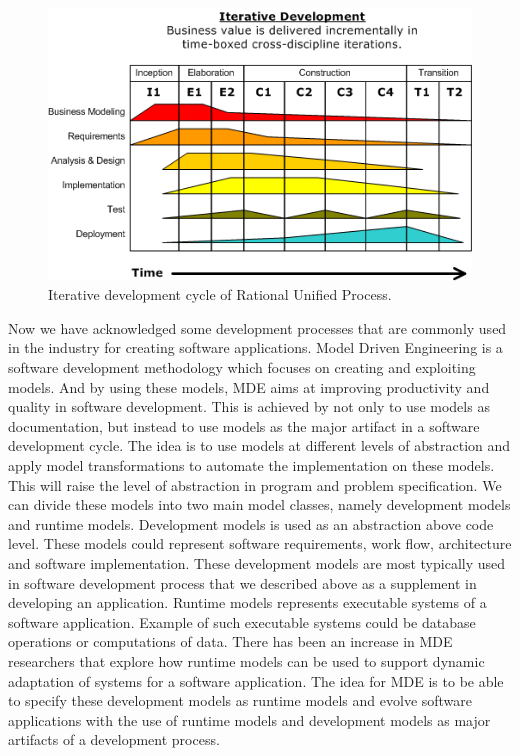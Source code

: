 \begin{figure}[H]
	\centering
	\includegraphics[scale=0.7]{./Figures/RUP.png}
	\caption[Rational Unified Process]
	{Iterative development cycle of Rational Unified Process.}
	\label{fig:RUP}
\end{figure}

Now we have acknowledged some development processes that are commonly used in
the industry for creating software applications. Model Driven Engineering is a
software development methodology which focuses on creating and exploiting
models. And by using these models,  MDE aims at improving productivity and
quality in software development. This is achieved by not only to use models as
documentation, but instead to use models as the major artifact in a software
development cycle. The idea is to use models at different levels of abstraction
and apply model transformations to automate the implementation on these
models. This will raise the level of abstraction in program and problem
specification. We can divide these models into two main model classes, namely
development models and runtime models. Development models is used as an
abstraction above code level. These models could represent software
requirements, work flow, architecture and software implementation. These
development models are most typically used in software development process that
we described above as a supplement in developing an application. Runtime models
represents executable systems of a software application. Example of such
executable systems could be database operations or computations of data. There
has been an increase in MDE researchers that explore how runtime models can be
used to support dynamic adaptation of systems for a software
application\cite{France2007}. The idea for MDE is to be able to specify these
development models as runtime models and evolve software applications with the
use of runtime models and development models as major artifacts of a development
process. 

